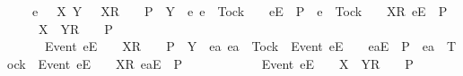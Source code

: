 \ \ \ \ {\isacharparenleft}{\isasymAnd}e\ {\isasymrho}\ {\isasymsigma}\ X\ Y{\isachardot}\ {\isacharparenleft}{\isacharparenleft}{\isasymrho}\ {\isacharat}\ {\isacharbrackleft}{\isacharbrackleft}X{\isacharbrackright}\isactrlsub R{\isacharbrackright}\ {\isacharat}\ {\isasymsigma}\ {\isasymin}\ P\ {\isasymand}\ {\isacharparenleft}Y\ {\isasyminter}\ {\isacharbraceleft}e{\isachardot}\ {\isacharparenleft}e\ {\isasymnoteq}\ Tock\ {\isasymand}\ {\isasymrho}\ {\isacharat}\ {\isacharbrackleft}{\isacharbrackleft}e{\isacharbrackright}\isactrlsub E{\isacharbrackright}\ {\isasymin}\ P{\isacharparenright}\ {\isasymor}\ {\isacharparenleft}e\ {\isacharequal}\ Tock\ {\isasymand}\ {\isasymrho}\ {\isacharat}\ {\isacharbrackleft}{\isacharbrackleft}X{\isacharbrackright}\isactrlsub R{\isacharcomma}\ {\isacharbrackleft}e{\isacharbrackright}\isactrlsub E{\isacharbrackright}\ {\isasymin}\ P{\isacharparenright}{\isacharbraceright}\ {\isacharequal}\ {\isacharbraceleft}{\isacharbraceright}{\isacharparenright}{\isacharparenright}\ {\isasymLongrightarrow}\ {\isasymrho}\ {\isacharat}\ {\isacharbrackleft}{\isacharbrackleft}X\ {\isasymunion}\ Y{\isacharbrackright}\isactrlsub R{\isacharbrackright}\ {\isacharat}\ {\isasymsigma}\ {\isasymin}\ P{\isacharparenright}\ {\isasymLongrightarrow}\ \isanewline
\ \ \ \ \ \ {\isacharparenleft}{\isacharparenleft}{\isacharbrackleft}Event\ e{\isacharbrackright}\isactrlsub E\ {\isacharhash}\ {\isasymrho}\ {\isacharat}\ {\isacharbrackleft}{\isacharbrackleft}X{\isacharbrackright}\isactrlsub R{\isacharbrackright}\ {\isacharat}\ {\isasymsigma}\ {\isasymin}\ P\ {\isasymand}\ {\isacharparenleft}Y\ {\isasyminter}\ {\isacharbraceleft}ea{\isachardot}\ {\isacharparenleft}ea\ {\isasymnoteq}\ Tock\ {\isasymand}\ {\isacharbrackleft}Event\ e{\isacharbrackright}\isactrlsub E\ {\isacharhash}\ {\isasymrho}\ {\isacharat}\ {\isacharbrackleft}{\isacharbrackleft}ea{\isacharbrackright}\isactrlsub E{\isacharbrackright}\ {\isasymin}\ P{\isacharparenright}\ {\isasymor}\ {\isacharparenleft}ea\ {\isacharequal}\ Tock\ {\isasymand}\ {\isacharbrackleft}Event\ e{\isacharbrackright}\isactrlsub E\ {\isacharhash}\ {\isasymrho}\ {\isacharat}\ {\isacharbrackleft}{\isacharbrackleft}X{\isacharbrackright}\isactrlsub R{\isacharcomma}\ {\isacharbrackleft}ea{\isacharbrackright}\isactrlsub E{\isacharbrackright}\ {\isasymin}\ P{\isacharparenright}{\isacharbraceright}\ {\isacharequal}\ {\isacharbraceleft}{\isacharbraceright}{\isacharparenright}{\isacharparenright}\ {\isasymLongrightarrow}\ \isanewline
\ \ \ \ \ \ \ \ {\isacharbrackleft}Event\ e{\isacharbrackright}\isactrlsub E\ {\isacharhash}\ {\isasymrho}\ {\isacharat}\ {\isacharbrackleft}{\isacharbrackleft}X\ {\isasymunion}\ Y{\isacharbrackright}\isactrlsub R{\isacharbrackright}\ {\isacharat}\ {\isasymsigma}\ {\isasymin}\ P{\isacharparenright}{\isacharparenright}\ {\isasymLongrightarrow}\isanewline
